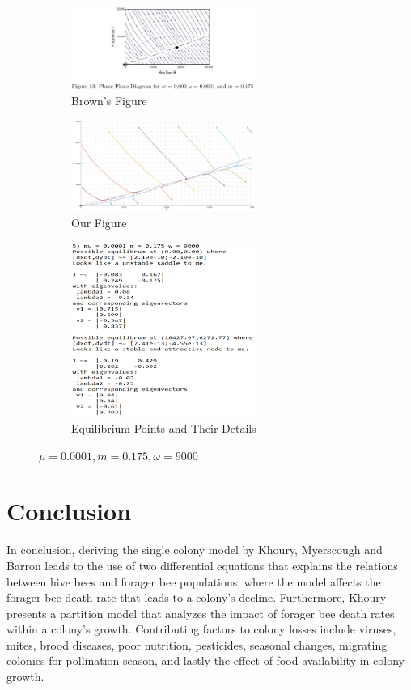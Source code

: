 \documentclass[a4paper,10pt]{article}
\begin{document}
\begin{figure}[H]
	\centering
	\begin{subfigure}[b]{0.4\textwidth}
		\centering
		\includegraphics[width=6cm]{Figure_13_5.jpg}%
		\caption{Brown's Figure\cite{Brown}}
	\end{subfigure}
	\hfill
	\begin{subfigure}[b]{0.4\textwidth}
		\centering
		\includegraphics[width=6cm]{FIgure_5_M483_Phase.png}
		\caption{Our Figure}
	\end{subfigure}
\begin{subfigure}[b]{0.4\textwidth}
		\centering
		\includegraphics[width = 6cm]{Project_App_Info_5.png}
		\caption{Equilibrium Points and Their Details}
	\end{subfigure}
	\caption{$\mu = 0.0001, m = 0.175, \omega = 9000$}
\end{figure}

\section{Conclusion}
In conclusion, deriving the single colony model by Khoury, Myerscough and Barron 
leads to the use of two differential equations that explains the relations between hive bees and forager bee populations; where the model affects the forager bee death rate that leads 
to a colony's decline. Furthermore, Khoury presents a partition model that analyzes the 
impact of forager bee death rates within a colony's growth. Contributing factors to 
colony losses include viruses, mites, brood diseases, poor nutrition, pesticides, 
seasonal changes, migrating colonies for pollination season, and lastly the effect of 
food availability in colony growth.\\
 
\end{document}

